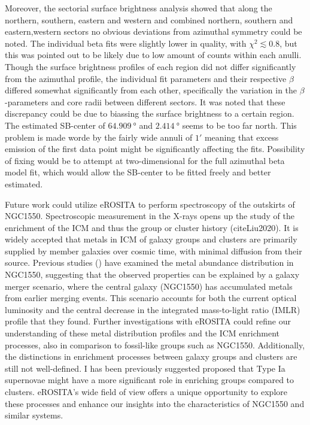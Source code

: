 Moreover, the sectorial surface brightness analysis showed that along the northern, southern, eastern and western and combined northern, southern and eastern,western sectors no obvious deviations from azimuthal symmetry could be noted. The individual beta fits were slightly lower in quality, with \(\chi^2 \lesssim 0.8\), but this was pointed out to be likely due to low amount of counts within each anulli. Though the surface brightness profiles of each region did not differ significantly from the azimuthal profile, the individual fit parameters and their respective \(\beta\) differed somewhat significantly from each other, specifically the variation in the \(\beta\)-parameters and core radii between different sectors. It was noted that these discrepancy could be due to biassing the surface brightness to a certain region. The estimated SB-center of \(\SI{64.909}{\degree}\) and \(\SI{2.414}{\degree}\) seems to be too far north. This problem is made worde by the fairly wide annuli of \(1'\) meaning that excess emission of the first data point might be significantly affecting the fits.  Possibility of fixing would be to attempt at two-dimensional for the full azimuthal beta model fit, which would allow the SB-center to be fitted freely and better estimated. 

Future work could utilize eROSITA to perform spectroscopy of the outskirts of NGC1550. Spectroscopic measurement in the X-rays opens up the study of the enrichment of the ICM and thus the group or cluster history (cite{Liu2020}). It is widely accepted that metals in ICM of galaxy groups and clusters are primarily supplied by member galaxies over cosmic time, with minimal diffusion from their source.  Previous studies (\cite{Kawaharada_2009}) have examined the metal abundance distribution in NGC1550, suggesting that the observed properties can be explained by a galaxy merger scenario, where the central galaxy (NGC1550) has accumulated metals from earlier merging events. This scenario accounts for both the current optical luminosity and the central decrease in the integrated mass-to-light ratio (IMLR) profile that they found. Further investigations with eROSITA could refine our understanding of these metal distribution profiles and the ICM enrichment processes, also in comparison to fossil-like groups such as NGC1550. Additionally, the distinctions in enrichment processes between galaxy groups and clusters are still not well-defined. I has been previously suggested proposed that Type Ia supernovae might have a more significant role in enriching groups compared to clusters. eROSITA's wide field of view offers a unique opportunity to explore these processes and enhance our insights into the characteristics of NGC1550 and similar systems.









